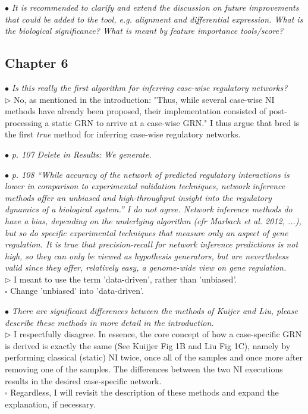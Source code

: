 \documentclass[10pt]{article}
\newcommand{\todo}{$\square$}
\newcommand{\exam}[2][\  ]{\hspace{0pt}\marginpar{\color{myred}#1}$\bullet$ \textit{#2}}
\newcommand{\nimp}[1]{{\color{mygray} #1}}
\newcommand{\answ}[1]{{\color{myblue} $\triangleright$ #1}}
\newcommand{\task}[2][\todo]{{\color{myblue} #1 #2}}
\newcommand{\bigexclaim}{\raisebox{-0.1em}{\BigTriangleUp}\hspace{-0.32em}\llap{\small\textbf{!}}\hspace{0.32em}}
\newcommand{\tagimp}{\bigexclaim}
\begin{document}
\exam{It is recommended to clarify and extend the discussion on future improvements that could be
	added to the tool, e.g. alignment and differential expression. What is the biological
	significance? What is meant by feature importance tools/score?}

\subsection{Chapter 6}


\exam{Is this really the first algorithm for inferring case-wise regulatory networks?} \\
\answ{No, as mentioned in the introduction: "Thus, while several case-wise NI methods have already been proposed, their implementation consisted of post-processing a static GRN to arrive at a case-wise GRN." I thus argue that bred is the first \textit{true} method for inferring case-wise regulatory networks.}

\exam[\tagimp]{p. 107 Delete in Results: We generate.}

\exam{\nimp{p. 108 “While accuracy of the network of predicted regulatory interactions is lower in
	comparison to experimental validation techniques, network inference methods offer an
	unbiased and high-throughput insight into the regulatory dynamics of a biological system.”} I
	do not agree. Network inference methods do have a bias, depending on the underlying
	algorithm (cfr Marbach et al. 2012, ...), but so do specific experimental techniques that
	measure only an aspect of gene regulation. It is true that precision-recall for network
	inference predictions is not high, so they can only be viewed as hypothesis generators, but
	are nevertheless valid since they offer, relatively easy, a genome-wide view on gene
	regulation.} \\
\answ{I meant to use the term 'data-driven', rather than 'unbiased'.} \\
\task{Change 'unbiased' into 'data-driven'.}

\exam{There are significant differences between the methods of Kuijer and Liu, please describe these methods in more detail in the introduction.} \\
\answ{I respectfully disagree. In essence, the core concept of how a case-specific GRN is derived is exactly the same (See Kuijjer Fig 1B and Liu Fig 1C), namely by performing classical (static) NI twice, once all of the samples and once more after removing one of the samples. The differences between the two NI executions results in the desired case-specific network.} \\
\task{Regardless, I will revisit the description of these methods and expand the explanation, if necessary.}
\end{document}
